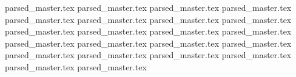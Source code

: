 \documentclass[a4paper]{article}
\begin{document}
\tableofcontents{}
{parsed_master.tex}	
{parsed_master.tex}	
{parsed_master.tex}	
{parsed_master.tex}	
{parsed_master.tex}	
{parsed_master.tex}	
{parsed_master.tex}	
{parsed_master.tex}	
{parsed_master.tex}	
{parsed_master.tex}	
{parsed_master.tex}	
{parsed_master.tex}	
{parsed_master.tex}	
{parsed_master.tex}	
{parsed_master.tex}	
{parsed_master.tex}	
{parsed_master.tex}	
{parsed_master.tex}	
{parsed_master.tex}	
{parsed_master.tex}	
{parsed_master.tex}	
{parsed_master.tex}	
\end{document}
